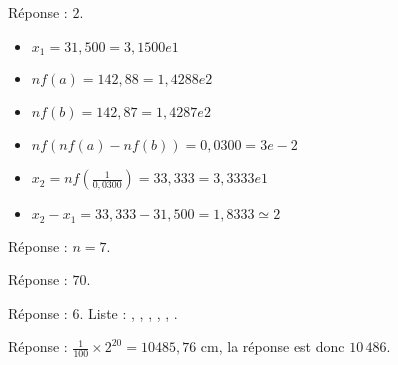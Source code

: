 \documentclass[class=report,crop=false, 12pt]{standalone}
\begin{document}
\begin{enigme}

Réponse : $2$.

\begin{itemize}
  \item $x_1 = 31,500 = 3,1500e1$
  \item $nf(a)=142,88 = 1,4288e2$
  \item $nf(b) = 142,87 = 1,4287e2$
  \item $nf(nf(a)-nf(b)) = 0,0300 = 3e-2$
  \item $x_2 = nf(\frac{1}{0,0300}) = 33,333 = 3,3333e1$
  \item $x_2-x_1 = 33,333-31,500 = 1,8333 \simeq 2$ 
\end{itemize}


\end{enigme}


\begin{enigme}[Si ... alors ...]
Réponse : $n=7$.
\end{enigme}




\begin{enigme}[Boucles I]

Réponse : $70$.

\end{enigme}



\begin{enigme}

Réponse : 6. Liste : , , , , , .

\end{enigme}


\begin{enigme}[Puissances de 2]

Réponse : $\frac{1}{100} \times 2^{20} = 10485,76$ cm, la réponse est donc $10\, 486$.%

\end{enigme}


\end{document}
